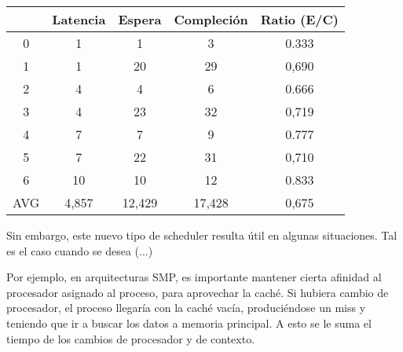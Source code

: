 \begin{table}[h]
  \begin{center}
    \begin{tabular}{c c c c c}
    \hline
          & Latencia & Espera & Compleción & Ratio (E/C) \\
    \hline
        0 &     1    &    1   &      3     &    0.333    \\
        1 &     1    &   20   &     29     &    0,690    \\
        2 &     4    &    4   &      6     &    0.666    \\
        3 &     4    &   23   &     32     &    0,719    \\
        4 &     7    &    7   &      9     &    0.777    \\
        5 &     7    &   22   &     31     &    0,710    \\
        6 &     10   &   10   &     12     &    0.833    \\
        AVG & 4,857  & 12,429 &   17,428   &    0,675    \\
    \end{tabular}
  \end{center}
\end{table}


Sin embargo, este nuevo tipo de scheduler resulta útil en algunas situaciones. Tal es el caso cuando se desea (...)

Por ejemplo, en arquitecturas SMP, es importante mantener cierta afinidad al procesador asignado al proceso, para aprovechar la caché. Si hubiera cambio de procesador, el proceso llegaría con la caché vacía, produciéndose un miss y teniendo que ir a buscar los datos a memoria principal. A esto se le suma el tiempo de los cambios de procesador y de contexto.





